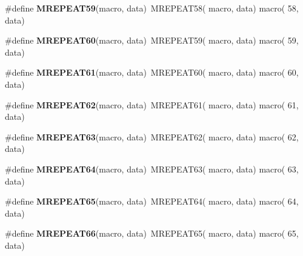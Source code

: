 \begin{DoxyCompactItemize}
\item 
\hypertarget{group__group__xmega__utils__mrepeat_ga0cdad412352b83b391e04d59bc7302b5}{\#define {\bfseries M\-R\-E\-P\-E\-A\-T59}(macro, data)~M\-R\-E\-P\-E\-A\-T58( macro, data)   macro( 58, data)}\label{group__group__xmega__utils__mrepeat_ga0cdad412352b83b391e04d59bc7302b5}

\item 
\hypertarget{group__group__xmega__utils__mrepeat_ga4fd4e49134a22edba74f048333b8a4e6}{\#define {\bfseries M\-R\-E\-P\-E\-A\-T60}(macro, data)~M\-R\-E\-P\-E\-A\-T59( macro, data)   macro( 59, data)}\label{group__group__xmega__utils__mrepeat_ga4fd4e49134a22edba74f048333b8a4e6}

\item 
\hypertarget{group__group__xmega__utils__mrepeat_ga91e94a0bcf2b901fcc9132cd2d20e5fc}{\#define {\bfseries M\-R\-E\-P\-E\-A\-T61}(macro, data)~M\-R\-E\-P\-E\-A\-T60( macro, data)   macro( 60, data)}\label{group__group__xmega__utils__mrepeat_ga91e94a0bcf2b901fcc9132cd2d20e5fc}

\item 
\hypertarget{group__group__xmega__utils__mrepeat_gac1aeda59af63e68b3212be845b9b1f5a}{\#define {\bfseries M\-R\-E\-P\-E\-A\-T62}(macro, data)~M\-R\-E\-P\-E\-A\-T61( macro, data)   macro( 61, data)}\label{group__group__xmega__utils__mrepeat_gac1aeda59af63e68b3212be845b9b1f5a}

\item 
\hypertarget{group__group__xmega__utils__mrepeat_ga73cede98c09bbcf55a373fbd3cfef422}{\#define {\bfseries M\-R\-E\-P\-E\-A\-T63}(macro, data)~M\-R\-E\-P\-E\-A\-T62( macro, data)   macro( 62, data)}\label{group__group__xmega__utils__mrepeat_ga73cede98c09bbcf55a373fbd3cfef422}

\item 
\hypertarget{group__group__xmega__utils__mrepeat_gae9165e7c138bde7089d78f4d39123c80}{\#define {\bfseries M\-R\-E\-P\-E\-A\-T64}(macro, data)~M\-R\-E\-P\-E\-A\-T63( macro, data)   macro( 63, data)}\label{group__group__xmega__utils__mrepeat_gae9165e7c138bde7089d78f4d39123c80}

\item 
\hypertarget{group__group__xmega__utils__mrepeat_ga823d5579d3d70018be17ac8323d074be}{\#define {\bfseries M\-R\-E\-P\-E\-A\-T65}(macro, data)~M\-R\-E\-P\-E\-A\-T64( macro, data)   macro( 64, data)}\label{group__group__xmega__utils__mrepeat_ga823d5579d3d70018be17ac8323d074be}

\item 
\hypertarget{group__group__xmega__utils__mrepeat_ga900ae85fc32323d04086e2dd4ce7a275}{\#define {\bfseries M\-R\-E\-P\-E\-A\-T66}(macro, data)~M\-R\-E\-P\-E\-A\-T65( macro, data)   macro( 65, data)}\label{group__group__xmega__utils__mrepeat_ga900ae85fc32323d04086e2dd4ce7a275}


\end{DoxyCompactItemize}
